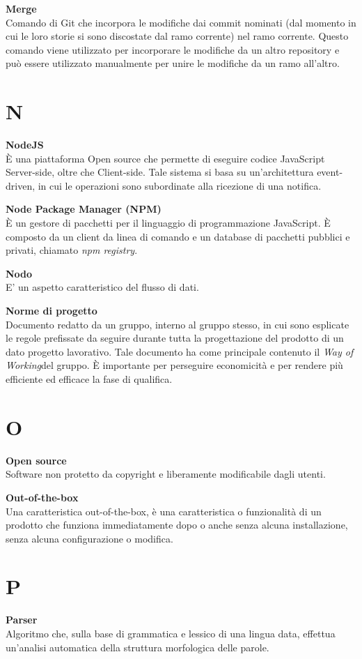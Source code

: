 \documentclass[a4paper, oneside, openany, dvipsnames, table, 12pt]{article}
\begin{document}
\textbf{Merge} \\
Comando di Git che incorpora le modifiche dai commit nominati (dal momento in cui le loro storie si sono discostate dal ramo corrente) nel ramo corrente. Questo comando viene utilizzato per incorporare le modifiche
da un altro repository e può essere utilizzato manualmente per unire le modifiche da un ramo all’altro.

\newpage
\section{N}
\textbf{NodeJS}\\	
\`E una piattaforma Open source che permette di eseguire codice JavaScript Server-side, oltre che Client-side. Tale sistema si basa su un'architettura event-driven, in cui le operazioni sono subordinate alla ricezione di una notifica.

\textbf{Node Package Manager (NPM)} \\
È un gestore di pacchetti per il linguaggio di programmazione JavaScript.
È composto da un client da linea di comando e un database di pacchetti pubblici e privati, chiamato \textit{npm registry}. 

\textbf{Nodo} \\
E' un aspetto caratteristico del flusso di dati.

\textbf{Norme di progetto} \\
Documento redatto da un gruppo, interno al gruppo stesso, in cui sono esplicate le regole prefissate da seguire durante tutta la progettazione del prodotto di un dato progetto lavorativo. Tale documento ha come principale contenuto il \textit{Way of Working}\glo del gruppo. È importante per perseguire economicità e per rendere più efficiente ed efficace la fase di qualifica.

\newpage
\section{O}
\label{par:opens}
\textbf{Open source} \\
Software non protetto da copyright e liberamente modificabile dagli utenti.

\textbf{Out-of-the-box} \\
Una caratteristica out-of-the-box, è una caratteristica o funzionalità di un prodotto che funziona immediatamente dopo o anche senza alcuna installazione, senza alcuna configurazione o modifica.

\newpage
\section{P}
\textbf{Parser} \\
Algoritmo che, sulla base di grammatica e lessico di una lingua data, effettua un’analisi automatica della struttura morfologica delle parole.
\end{document}
